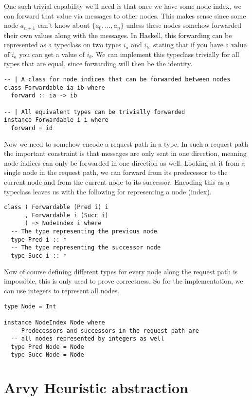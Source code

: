 \documentclass[a4paper, oneside]{discothesis}
\begin{document}
One such trivial capability we'll need is that once we have some node index, we can forward that value via messages to other nodes. This makes sense since some node $a_{n+1}$ can't know about $\{a_0,\dots,a_n\}$ unless these nodes somehow forwarded their own values along with the messages. In Haskell, this forwarding can be represented as a typeclass on two types $i_a$ and $i_b$, stating that if you have a value of $i_a$ you can get a value of $i_b$. We can implement this typeclass trivially for all types that are equal, since forwarding will then be the identity.

\begin{verbatim}
-- | A class for node indices that can be forwarded between nodes
class Forwardable ia ib where
  forward :: ia -> ib

-- | All equivalent types can be trivially forwarded
instance Forwardable i i where
  forward = id
\end{verbatim}

Now we need to somehow encode a request path in a type. In such a request path the important constraint is that messages are only sent in one direction, meaning node indices can only be forwarded in one direction as well. Looking at it from a single node in the request path, we can forward from its predecessor to the current node and from the current node to its successor. Encoding this as a typeclass leaves us with the following for representing a node (index).

\begin{verbatim}
class ( Forwardable (Pred i) i
      , Forwardable i (Succ i)
      ) => NodeIndex i where
  -- The type representing the previous node
  type Pred i :: *
  -- The type representing the successor node
  type Succ i :: *
\end{verbatim}

Now of course defining different types for every node along the request path is impossible, this is only used to prove correctness. So for the implementation, we can use integers to represent all nodes.

\begin{verbatim}
type Node = Int

instance NodeIndex Node where
  -- Predecessors and successors in the request path are
  -- all nodes represented by integers as well
  type Pred Node = Node
  type Succ Node = Node
\end{verbatim}

\section{Arvy Heuristic abstraction}
\end{document}
